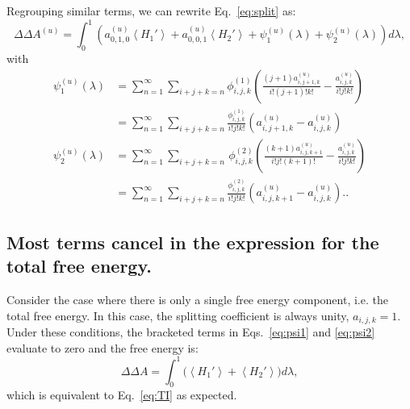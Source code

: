 \documentclass{article}
\begin{document}
Regrouping similar terms, we can rewrite Eq.~\ref{eq:split} as:
\begin{equation}
\Delta\Delta A^{(u)} =
	\int_0^1 \left(
        a_{0,1,0}^{(u)}\left\langle H_1' \right\rangle +
        a_{0,0,1}^{(u)}\left\langle H_2' \right\rangle +
        \psi_1^{(u)}(\lambda) +
        \psi_2^{(u)}(\lambda)
    \right) d\lambda,
\end{equation}
with
\begin{align}
\psi_1^{(u)}(\lambda) &=
	\sum_{n=1}^{\infty}
    \sum_{i+j+k=n}
        \phi_{i,j,k}^{(1)}\left(
            \frac
                {(j+1)a_{i,j+1,k}^{(u)}}
                {i!(j+1)!k!} -
            \frac
                {a_{i,j,k}^{(u)}}
                {i!j!k!}
        \right) \nonumber\\
    &=
	\sum_{n=1}^{\infty}
    \sum_{i+j+k=n}
        \frac{\phi_{i,j,k}^{(1)}}{i!j!k!}
        \left(
            {a_{i,j+1,k}^{(u)}} -
            {a_{i,j,k}^{(u)}}
        \right) \label{eq:psi1}\\
\psi_2^{(u)}(\lambda) &=
	\sum_{n=1}^{\infty}
    \sum_{i+j+k=n}
    	\frac{}{}
        \phi_{i,j,k}^{(2)}\left(
            \frac
                {(k+1)a_{i,j,k+1}^{(u)}}
                {i!j!(k+1)!} -
            \frac
                {a_{i,j,k}^{(u)}}
                {i!j!k!}
      	\right)\nonumber\\
    &=
	\sum_{n=1}^{\infty}
    \sum_{i+j+k=n}
        \frac{\phi_{i,j,k}^{(2)}}{i!j!k!}
        \left(
            a_{i,j,k+1}^{(u)} -
            a_{i,j,k}^{(u)}
      	\right)\label{eq:psi2}.        .
\end{align}



\subsection{Most terms cancel in the expression for the total free energy.}

Consider the case where there is only a single free energy component, i.e. the total free energy. In this case, the splitting coefficient is always unity, $a_{i,j,k}=1$. Under these conditions, the bracketed terms in Eqs.~\ref{eq:psi1} and \ref{eq:psi2} evaluate to zero and the free energy is:
\begin{equation}
\Delta\Delta A = \int_0^1 \bigg(
	\left\langle H_1' \right\rangle +
    \left\langle H_2' \right\rangle
\bigg) d\lambda,
\end{equation}
which is equivalent to Eq.~\ref{eq:TI} as expected.
\end{document}
